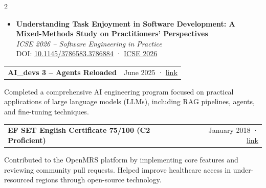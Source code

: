 \documentclass[10pt,a4paper,ragged2e,withhyper]{altacv}
\makeatletter
\newcommand{\cvsimpleitem}[2]{%
  \begin{tabularx}{\linewidth}{@{} >{\raggedright\arraybackslash}X r @{}}
  \bfseries\textcolor{emphasis}{#1} & \small #2
  \end{tabularx}\smallskip
}
\makeatother
\begin{document}
\begin{paracol}{2}
\begin{itemize}
  \item \textbf{Understanding Task Enjoyment in Software Development: A Mixed-Methods Study on Practitioners' Perspectives}\\
  \textit{ICSE 2026 -- Software Engineering in Practice}\\
  DOI: \href{https://doi.org/10.1145/3786583.3786884}{10.1145/3786583.3786884} · \href{https://conf.researchr.org/details/icse-2026/icse-2026-software-engineering-in-practice/31/Understanding-Task-Enjoyment-in-Software-Development-A-Mixed-Methods-Study-on-Practi}{ICSE 2026}
\end{itemize}

\switchcolumn



\cvsimpleitem{AI\_devs 3 -- Agents Reloaded}{June 2025 · \href{https://link.rasztabiga.me/aidevs}{link}}

\small{Completed a comprehensive AI engineering program focused on practical applications of large language models (LLMs), including RAG pipelines, agents, and fine-tuning techniques.}

\divider

\cvsimpleitem{EF SET English Certificate 75/100 (C2 Proficient)}{January 2018 · \href{https://cert.efset.org/Y6YgEc}{link}}


\small{Contributed to the OpenMRS platform by implementing core features and reviewing community pull requests. Helped improve healthcare access in under-resourced regions through open-source technology.}

\end{paracol}
\end{document}
